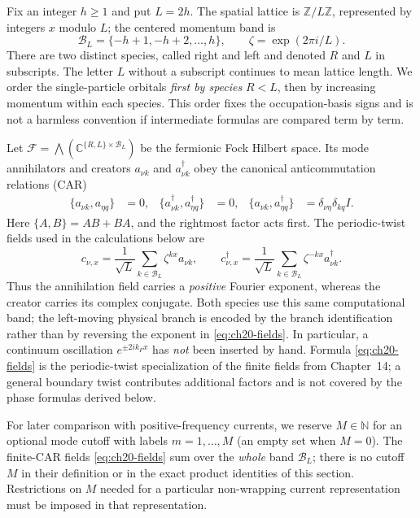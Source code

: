 Fix an integer \(h\geq 1\) and put \(L=2h\).  The spatial lattice is
\(\mathbb Z/L\mathbb Z\), represented by integers \(x\) modulo \(L\); the
centered momentum band is
\begin{equation}
  \mathcal B_L=\{-h+1,-h+2,\ldots,h\},\qquad
  \zeta=\exp(2\pi i/L).
  \label{eq:ch20-band}
\end{equation}
There are two distinct species, called right and left and denoted
\(R\) and \(L\) in subscripts.  The letter \(L\) without a subscript
continues to mean lattice length.  We order the single-particle orbitals
\emph{first by species} \(R<L\), then by increasing momentum within each
species.  This order fixes the occupation-basis signs and is not a harmless
convention if intermediate formulas are compared term by term.

Let
\(\mathcal F=\bigwedge(\mathbb C^{\{R,L\}\times\mathcal B_L})\)
be the fermionic Fock Hilbert space.  Its mode annihilators and creators
\(a_{\nu k}\) and \(a_{\nu k}^{\dagger}\) obey the canonical
anticommutation relations (CAR)
\begin{align}
 \{a_{\nu k},a_{\eta q}\}&=0,
 &\{a_{\nu k}^{\dagger},a_{\eta q}^{\dagger}\}&=0,
 &\{a_{\nu k},a_{\eta q}^{\dagger}\}&=
             \delta_{\nu\eta}\delta_{kq}I.
 \label{eq:ch20-car}
\end{align}
Here \(\{A,B\}=AB+BA\), and the rightmost factor acts first.  The
periodic-twist fields used in the calculations below are
\begin{equation}
 c_{\nu,x}=\frac1{\sqrt L}\sum_{k\in\mathcal B_L}
       \zeta^{kx}a_{\nu k},\qquad
 c_{\nu,x}^{\dagger}=\frac1{\sqrt L}\sum_{k\in\mathcal B_L}
       \zeta^{-kx}a_{\nu k}^{\dagger}.
 \label{eq:ch20-fields}
\end{equation}
Thus the annihilation field carries a \emph{positive} Fourier exponent,
whereas the creator carries its complex conjugate.  Both species use this
same computational band; the left-moving physical branch is encoded by the
branch identification rather than by reversing the exponent in
\eqref{eq:ch20-fields}.  In particular, a continuum oscillation
\(e^{\pm2ik_Fx}\) has \emph{not} been inserted by hand.  Formula
\eqref{eq:ch20-fields} is the periodic-twist specialization of the
finite fields from Chapter~14; a general boundary twist contributes
additional factors and is not covered by the phase formulas derived below.

For later comparison with positive-frequency currents, we reserve
\(M\in\mathbb N\) for an optional mode cutoff with labels
\(m=1,\ldots,M\) (an empty set when \(M=0\)).  The finite-CAR fields
\eqref{eq:ch20-fields} sum over the \emph{whole} band \(\mathcal B_L\);
there is no cutoff \(M\) in their definition or in the exact product
identities of this section.  Restrictions on \(M\) needed for a particular
non-wrapping current representation must be imposed in that representation.


